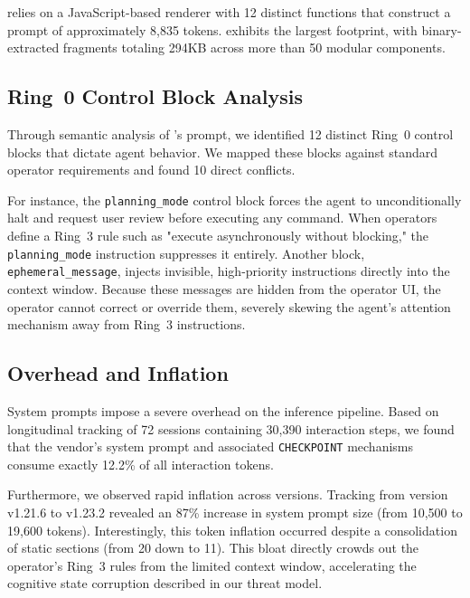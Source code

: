 \statsig{} relies on a JavaScript-based renderer with 12 distinct functions that construct a prompt of approximately 8,835 tokens. \clearcut{} exhibits the largest footprint, with binary-extracted fragments totaling 294KB across more than 50 modular components.

\subsection{Ring~0 Control Block Analysis}
Through semantic analysis of \cortex{}'s prompt, we identified 12 distinct Ring~0 control blocks that dictate agent behavior. We mapped these blocks against standard operator requirements and found 10 direct conflicts. 

For instance, the \texttt{planning\_mode} control block forces the agent to unconditionally halt and request user review before executing any command. When operators define a Ring~3 rule such as "execute asynchronously without blocking," the \texttt{planning\_mode} instruction suppresses it entirely. Another block, \texttt{ephemeral\_message}, injects invisible, high-priority instructions directly into the context window. Because these messages are hidden from the operator UI, the operator cannot correct or override them, severely skewing the agent's attention mechanism away from Ring~3 instructions.

\subsection{Overhead and Inflation}
System prompts impose a severe overhead on the inference pipeline. Based on longitudinal tracking of 72 sessions containing 30,390 interaction steps, we found that the vendor's system prompt and associated \texttt{CHECKPOINT} mechanisms consume exactly 12.2\% of all interaction tokens. 

Furthermore, we observed rapid inflation across versions. Tracking \cortex{} from version v1.21.6 to v1.23.2 revealed an 87\% increase in system prompt size (from 10,500 to 19,600 tokens). Interestingly, this token inflation occurred despite a consolidation of static sections (from 20 down to 11). This bloat directly crowds out the operator's Ring~3 rules from the limited context window, accelerating the cognitive state corruption described in our threat model.
